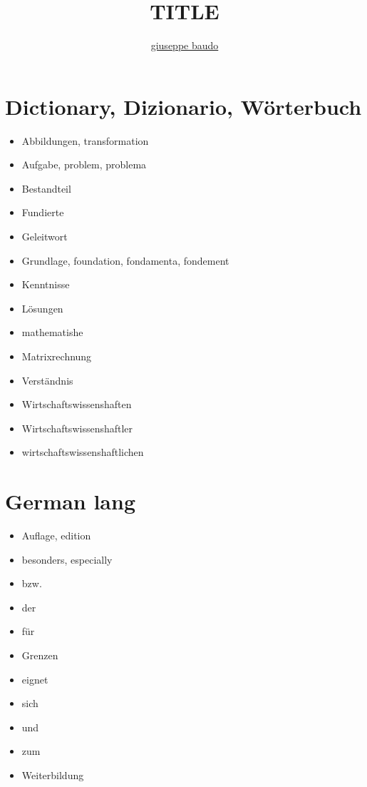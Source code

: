 \documentclass[a4paper,10pt]{article}
\title{TITLE}
\author{\href{http://www.baudo.hol.es}{giuseppe baudo}}
\begin{document}
\maketitle

\section{Dictionary, Dizionario, W\"{o}rterbuch}
  \begin{itemize}
   \item Abbildungen, transformation
   \item Aufgabe, problem, problema
   \item Bestandteil
   \item Fundierte
   \item Geleitwort
   \item Grundlage, foundation, fondamenta, fondement
   \item Kenntnisse
   \item L\"{o}sungen
   \item mathematishe
   \item Matrixrechnung
   \item Verst\"{a}ndnis
   \item Wirtschaftswissenshaften
   \item Wirtschaftswissenshaftler   
   \item wirtschaftswissenshaftlichen
  \end{itemize}

\section{German lang}
\begin{itemize}
 \item Auflage, edition
 \item besonders, especially
 \item bzw.
 \item der
 \item f\"{u}r
 \item Grenzen
 \item eignet
 \item sich
 \item und
 \item zum
 \item Weiterbildung
\end{itemize}
\end{document}
